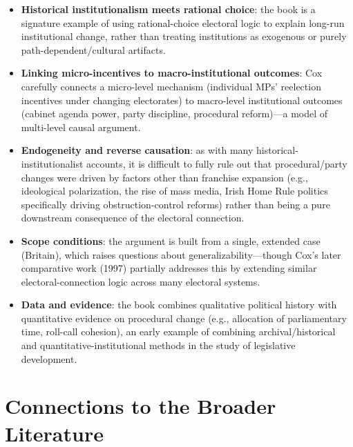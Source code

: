 \documentclass[12pt]{article}
\begin{document}
\begin{itemize}[leftmargin=*, itemsep=4pt]
    \item \textbf{Historical institutionalism meets rational choice}: the book is a signature example of using rational-choice electoral logic to explain long-run institutional change, rather than treating institutions as exogenous or purely path-dependent/cultural artifacts.
    \item \textbf{Linking micro-incentives to macro-institutional outcomes}: Cox carefully connects a micro-level mechanism (individual MPs' reelection incentives under changing electorates) to macro-level institutional outcomes (cabinet agenda power, party discipline, procedural reform)---a model of multi-level causal argument.
    \item \textbf{Endogeneity and reverse causation}: as with many historical-institutionalist accounts, it is difficult to fully rule out that procedural/party changes were driven by factors other than franchise expansion (e.g., ideological polarization, the rise of mass media, Irish Home Rule politics specifically driving obstruction-control reforms) rather than being a pure downstream consequence of the electoral connection.
    \item \textbf{Scope conditions}: the argument is built from a single, extended case (Britain), which raises questions about generalizability---though Cox's later comparative work (1997) partially addresses this by extending similar electoral-connection logic across many electoral systems.
    \item \textbf{Data and evidence}: the book combines qualitative political history with quantitative evidence on procedural change (e.g., allocation of parliamentary time, roll-call cohesion), an early example of combining archival/historical and quantitative-institutional methods in the study of legislative development.
\end{itemize}

\section{Connections to the Broader Literature}
\end{document}
